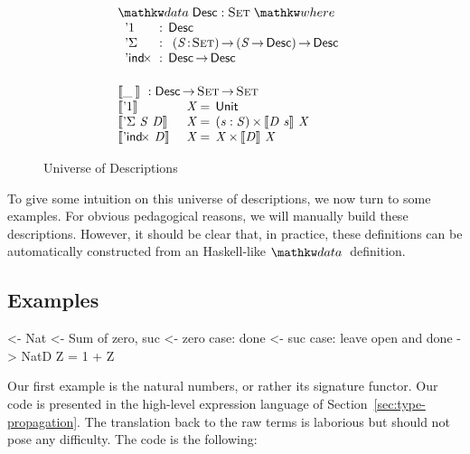 \begin{figure}

\[\stk{
\begin{array}{ll}
\stk{
\data \Desc : \Set \where \\
\;\;\begin{array}{@{}l@{\::\:\:}l@{\quad}l}
    \DUnit          & \Desc \\
    \DSigma         & \PI{\V{S}}{\Set} \PIS{\V{S} \To \Desc} \Desc \\
    \DIndx          & \Desc \To \Desc
\end{array}
}
\vspace{0.2in}
\\
\stk{
\descop{\_\:}{} : \Desc \To \Set \To \Set \\
\begin{array}{@{}ll@{\:=\:\:}ll}
\descop{\DUnit}{& \V{X}}        &  \Unit                                       \\
\descop{\DSigma{\V{S}}{\V{D}}}{& \V{X}} &  \SIGMAS{\V{s} : \V{S}}{\descop{\V{D}~\V{s}}{\V{X}}}         \\
\descop{\DIndx{\V{D}}}{& \V{X}}     &  \TIMES{\V{X}}{\descop{\V{D}}{\V{X}}}
\end{array}
}
\end{array}
}\]


\caption{Universe of Descriptions}
\label{fig:desc_universe}

\end{figure}

To give some intuition on this universe of descriptions, we now turn
to some examples. For obvious pedagogical reasons, we will manually
build these descriptions. However, it should be clear that, in
practice, these definitions can be automatically constructed from an
Haskell-like $\data$ definition.

\subsection{Examples}
\label{sec:desc-examples}

\begin{wstructure}
<- Nat
    <- Sum of zero, suc
    <- zero case: done
    <- suc case: leave open and done
    -> NatD Z = 1 + Z
\end{wstructure}

Our first example is the natural numbers, or rather its signature
functor. Our code is presented in the high-level expression language
of Section~\ref{sec:type-propagation}. The translation back to the raw
terms is laborious but should not pose any difficulty. The code is the
following:


